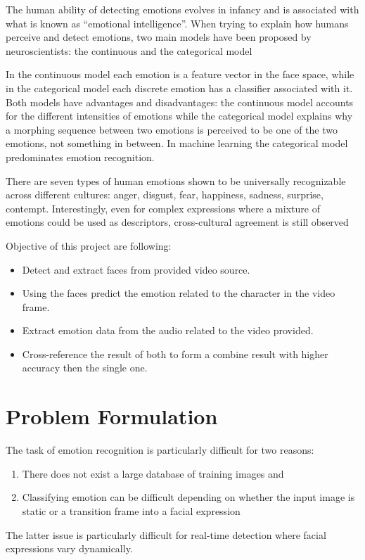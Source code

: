 The human ability of detecting emotions evolves in infancy and is associated with what is known as “emotional intelligence”. When trying to explain how humans perceive and detect emotions, two main models have been proposed by neuroscientists: the continuous and the categorical model

In the continuous model each emotion is a feature vector in the face space, while in the categorical model each discrete emotion has a classifier associated with it. Both models have advantages and disadvantages: the continuous model accounts for the different intensities of emotions while the categorical model explains why a morphing sequence between two emotions is perceived to be one of the two emotions, not something in between. In machine learning the categorical model predominates emotion recognition.

There are seven types of human emotions shown to be universally recognizable across different cultures: anger, disgust, fear, happiness, sadness, surprise, contempt. Interestingly, even for complex expressions where a mixture of emotions could be used as descriptors, cross-cultural agreement is still observed

\vskip 0.5cm
Objective of this project are following:
\begin{itemize}
	\item Detect and extract faces from provided video source.
	\item Using the faces predict the emotion related to the character in the video frame.
	\item Extract emotion data from the audio related to the video provided.
	\item Cross-reference the result of both to form a combine result with higher accuracy then the single one.
\end{itemize}

\section{Problem Formulation}
The task of emotion recognition is particularly difficult for two reasons:
\begin{enumerate}
	\item There does not exist a large database of training images and
	\item Classifying emotion can be difficult depending on whether the input image is static or a transition frame into a facial expression
\end{enumerate}
The latter issue is particularly difficult for real-time detection where facial expressions vary dynamically.

